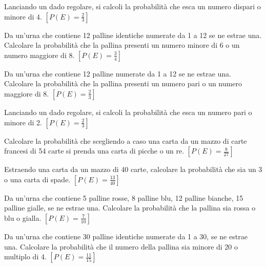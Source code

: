 \begin{esercizio}[\Ast]
 \label{ese:9.28}
 Lanciando un dado regolare, si calcoli la probabilità che esca un numero 
dispari o minore di 4.
\hfill \(\left[P(E)=\frac 2 3\right]\)
\end{esercizio}

\begin{esercizio}[\Ast]
 \label{ese:9.29}
Da un'urna che contiene 12 palline identiche numerate da 1 a 12 se ne estrae 
una. Calcolare la probabilità che la pallina presenti un numero minore di 6 o un 
numero maggiore di 8.
\hfill \(\left[P(E)=\frac 3 4\right]\)
\end{esercizio}

\begin{esercizio}[\Ast]
 \label{ese:9.30}
Da un'urna che contiene 12 palline numerate da 1 a 12 se ne estrae una. 
Calcolare la probabilità che la pallina presenti un numero pari o un numero 
maggiore di 8.
\hfill \(\left[P(E)=\frac 2 3\right]\)
\end{esercizio}

\begin{esercizio}[\Ast]
 \label{ese:9.31}
Lanciando un dado regolare, si calcoli la probabilità che esca un numero pari o 
minore di 2.
\hfill \(\left[P(E)=\frac 2 3\right]\)
\end{esercizio}

\begin{esercizio}[\Ast]
 \label{ese:9.32}
Calcolare la probabilità che scegliendo a caso una carta da un mazzo di carte 
francesi di 54 carte si prenda una carta di picche o un re.
\hfill \(\left[P(E)=\frac 8{27}\right]\)
\end{esercizio}

\begin{esercizio}[\Ast]
 \label{ese:9.33}
Estraendo una carta da un mazzo di 40 carte, calcolare la probabilità che sia un 
3 o una carta di spade.
\hfill \(\left[P(E)=\frac{13}{40}\right]\)
\end{esercizio}

\begin{esercizio}[\Ast]
 \label{ese:9.34}
 Da un'urna che contiene 5 palline rosse, 8 palline blu, 12 palline bianche, 15 
palline gialle, se ne estrae una. Calcolare la probabilità che la pallina sia 
rossa o blu o gialla.
\hfill \(\left[P(E)=\frac 7{10}\right]\)
\end{esercizio}

\begin{esercizio}[\Ast]
 \label{ese:9.35}
Da un'urna che contiene 30 palline identiche numerate da 1 a 30, se ne estrae 
una. Calcolare la probabilità che il numero della pallina sia minore di 20 o 
multiplo di 4.
\hfill \(\left[P(E)=\frac{11}{15}\right]\)
\end{esercizio}

